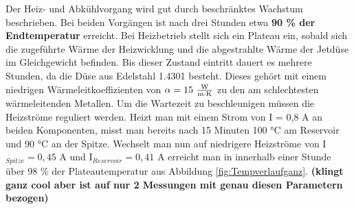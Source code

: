 Der Heiz- und Abkühlvorgang wird gut durch beschränktes Wachstum beschrieben. Bei beiden Vorgängen ist nach drei Stunden etwa \textbf{90 \% der Endtemperatur} erreicht. Bei Heizbetrieb stellt sich ein Plateau ein, sobald sich die zugeführte Wärme der Heizwicklung und die abgestrahlte Wärme der Jetdüse im Gleichgewicht befinden. Bis dieser Zustand eintritt dauert es mehrere Stunden, da die Düse aus Edelstahl 1.4301 besteht. Dieses gehört mit einem niedrigen Wärmeleitkoeffizienten von $\alpha = 15\ \frac{\textmd{W}}{\textmd{m}\cdot \textmd{K}}$ zu den am schlechtesten wärmeleitenden Metallen. Um die Wartezeit zu beschleunigen müssen die Heizströme reguliert werden. Heizt man mit einem Strom von I = 0,8 A an beiden Komponenten, misst man bereits nach 15 Minuten 100 °C am Reservoir und 90 °C an der Spitze. Wechselt man nun auf niedrigere Heizströme von I$_{Spitze} = 0,45$ A und I$_{Reservoir} = 0,41$ A erreicht man in innerhalb einer Stunde über 98 \% der Plateautemperatur aus Abbildung \ref{fig:Tempverlaufganz}. \textbf{(klingt ganz cool aber ist auf nur 2 Messungen mit genau diesen Parametern bezogen)}

